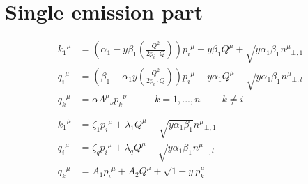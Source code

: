 \section{Single emission part}
\begin{equation}
	\begin{aligned}
	{k_1}^{\mu} &= (\alpha_1 -y\beta_1(\frac{Q^2}{2p_i \cdot Q})) {p_i}^{\mu} + y\beta_1{Q}^{\mu} + \sqrt{y\alpha_1\beta_1}{n^{\mu}}_{\bot,1}  \\
	{q_i}^{\mu}   &= (\beta_1 -\alpha_1 y(\frac{Q^2}{2p_i \cdot Q})){p_i}^{\mu} + y\alpha_1{Q}^{\mu} - \sqrt{y\alpha_1\beta_1}{n^{\mu}}_{\bot,l} \\
	{q_k}^{\mu} &= \alpha {\Lambda^{\mu}}_{\nu}{p_k}^{\nu} \:\:\:\:\:\:\:\:\:\:\:\:\: {k=1,...,n}\:\:\:\:\:\:\:\:\:\:k\neq i\\
	\\
	\\
		{k_1}^{\mu} &= \zeta_1 {p_i}^{\mu} + \lambda_1{Q}^{\mu} + \sqrt{y\alpha_1\beta_1}{n^{\mu}}_{\bot,1}  \\
	{q_i}^{\mu}   &= \zeta_q{p_i}^{\mu} + \lambda_q{Q}^{\mu} - \sqrt{y\alpha_1\beta_1}{n^{\mu}}_{\bot,l} \\
	{q_k}^{\mu} &= A_1{p_i}^{\mu} + A_2{Q}^{\mu} + \sqrt{1-y}{p_k^{\mu}}\\
    \end{aligned}
\end{equation}

